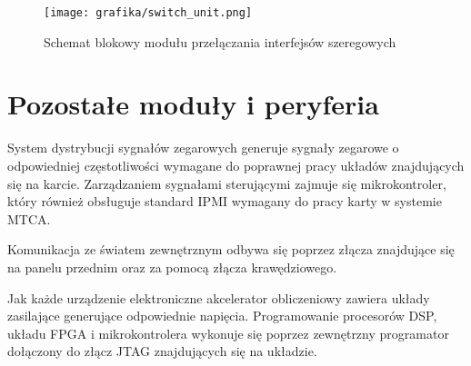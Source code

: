 \begin{figure}[!h]
\begin{center}
\texttt{[image: grafika/switch\_unit.png]}
\end{center}
\caption{Schemat blokowy modułu przełączania interfejsów szeregowych}
\label{BLOCK_SWITCH}
\end{figure}

\section{Pozostałe moduły i peryferia}
System dystrybucji sygnałów zegarowych generuje sygnały zegarowe o odpowiedniej częstotliwości wymagane do poprawnej pracy układów znajdujących się na karcie. Zarządzaniem sygnałami sterującymi zajmuje się mikrokontroler, który również obsługuje standard IPMI wymagany do pracy karty w systemie MTCA. 

Komunikacja ze światem zewnętrznym odbywa się poprzez złącza znajdujące się na panelu przednim oraz za pomocą złącza krawędziowego.

Jak każde urządzenie elektroniczne akcelerator obliczeniowy zawiera układy zasilające generujące odpowiednie napięcia. Programowanie procesorów DSP, układu FPGA i mikrokontrolera wykonuje się poprzez zewnętrzny programator dołączony do złącz JTAG znajdujących się na układzie. 

